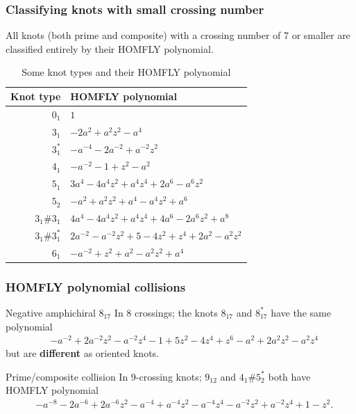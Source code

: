 \documentclass[presentation]{beamer}
\begin{document}
\begin{frame}
  \frametitle{Classifying knots with small crossing number}
  All knots (both prime and composite) with a crossing number of 7 or
  smaller are classified entirely by their HOMFLY polynomial.

  \begin{table}
    \centering
    \begin{tabular}{r|l}
      Knot type & HOMFLY polynomial \\
      \hline
      $0_1$ & $1$ \\
      $3_1$ & $-2a^{2} + a^{2}z^{2} -a^{4}$ \\
      $3_1^*$ & $-a^{-4} -2a^{-2} + a^{-2}z^{2}$ \\
      $4_1$ & $-a^{-2} -1 + z^{2} -a^{2}$ \\
      $5_1$ & $3a^{4} -4a^{4}z^{2} + a^{4}z^{4} + 2a^{6} -a^{6}z^{2}$ \\
      $5_2$ & $-a^{2} + a^{2}z^{2} + a^{4} -a^{4}z^{2} + a^{6}$ \\
      $3_1 \# 3_1$ & $4a^{4} -4a^{4}z^{2} + a^{4}z^{4} + 4a^{6} -2a^{6}z^{2} + a^{8}$ \\
      $3_1 \# 3_1^*$ & $2a^{-2} -a^{-2}z^{2} + 5 -4z^{2} + z^{4} + 2a^{2} -a^{2}z^{2}$ \\
      $6_1$ & $-a^{-2} + z^{2} + a^{2} -a^{2}z^{2} + a^{4}$ \\
    \end{tabular}
    \caption{Some knot types and their HOMFLY polynomial}
    \label{tab:homflys}
  \end{table}
\end{frame}

\begin{frame}
  \frametitle{HOMFLY polynomial collisions}
  \begin{block}{Negative amphichiral $8_{17}$}
    In 8 crossings; the
    knots $8_{17}$ and $8_{17}^*$ have the same polynomial
    {\footnotesize\begin{align*}
      & -a^{-2} + 2a^{-2}z^{2} -a^{-2}z^{4} -1 + 5z^{2} -4z^{4} +
        z^{6} -a^{2} + 2a^{2}z^{2} -a^{2}z^{4}
    \end{align*}}
    but are \textbf{different} as oriented knots.
  \end{block}

  \begin{block}{Prime/composite collision}
    In 9-crossing knots; $9_{12}$ and $4_1 \# 5_2^*$ both
    have HOMFLY polynomial
    {\footnotesize\begin{align*}
      &-a^{-8} -2a^{-6} + 2a^{-6}z^{2} -a^{-4} + a^{-4}z^{2} -a^{-4}z^{4} -a^{-2}z^{2} + a^{-2}z^{4} + 1 -z^{2}.
    \end{align*}}
  \end{block}

\end{frame}
\end{document}

